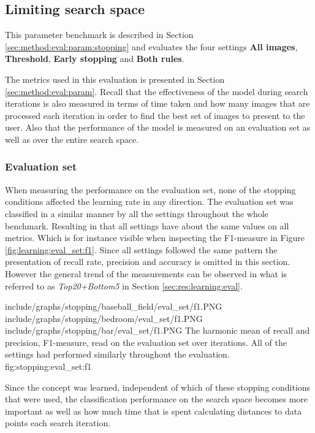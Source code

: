 
\subsection{Limiting search space}
\label{sec:res:stopping}

This parameter benchmark is described in Section \ref{sec:method:eval:param:stopping} and evaluates the four settings 
\textbf{All images}, \textbf{Threshold}, \textbf{Early stopping} and \textbf{Both rules}.

The metrics used in this evaluation is presented in Section \ref{sec:method:eval:param}. Recall that the effectiveness of the model during search iterations is also measured in terms of time taken and how many images that are processed each iteration in order to find the best set of images to present to the user. Also that the performance of the model is measured on an evaluation set as well as over the entire search space. 

\subsubsection{Evaluation set}
When measuring the performance on the evaluation set, none of the stopping conditions affected the learning rate in any direction. The evaluation set was  classified in a similar manner by all the settings throughout the whole benchmark. 
Resulting in that all settings have about the same values on all metrics. Which is for instance visible when inspecting the F1-measure in Figure \ref{fig:learning:eval_set:f1}. Since all settings followed the same pattern the presentation of recall rate, precision and accuracy is omitted in this section. However the general trend of the measurements can be observed in what is referred to as \emph{Top20+Bottom5} in Section \ref{sec:res:learning:eval}.

\tripfigure
{include/graphs/stopping/baseball_field/eval_set/f1.PNG}
{include/graphs/stopping/bedroom/eval_set/f1.PNG}
{include/graphs/stopping/bar/eval_set/f1.PNG}
{The harmonic mean of recall and precision, F1-measure, read on the evaluation set over iterations. All of the settings had performed similarly throughout the evaluation.}
{fig:stopping:eval_set:f1}

Since the concept was learned, independent of which of these stopping conditions that were used, the classification performance on the search space becomes more important as well as how much time that is spent calculating distances to data points each search iteration.

